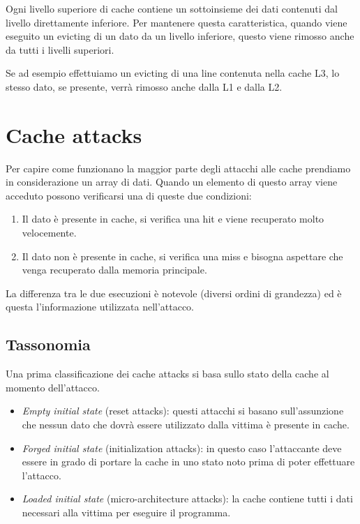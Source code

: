 				Ogni livello superiore di cache contiene un sottoinsieme dei dati contenuti dal livello direttamente inferiore. Per mantenere questa caratteristica, quando viene eseguito un evicting di un dato da un livello inferiore, questo viene rimosso anche da tutti i livelli superiori.
				
				Se ad esempio effettuiamo un evicting di una line contenuta nella cache L3, lo stesso dato, se presente, verrà rimosso anche dalla L1 e dalla L2.
				
	\section{Cache attacks}
		Per capire come funzionano la maggior parte degli attacchi alle cache prendiamo in considerazione un array di dati. Quando un elemento di questo array viene acceduto possono verificarsi una di queste due condizioni:
		
		\begin{enumerate}
			\item Il dato è presente in cache, si verifica una hit e viene recuperato molto velocemente.
			\item Il dato non è presente in cache, si verifica una miss e bisogna aspettare che venga recuperato dalla memoria principale.
		\end{enumerate}
		
		La differenza tra le due esecuzioni è notevole (diversi ordini di grandezza) ed è questa l'informazione utilizzata nell'attacco.
		
		\subsection{Tassonomia}
			Una prima classificazione dei cache attacks si basa sullo stato della cache al momento dell'attacco\cite{canteaut2006understanding}.
			
			\begin{itemize}
				\item \emph{Empty initial state} (reset attacks): questi attacchi si basano sull'assunzione che nessun dato che dovrà essere utilizzato dalla vittima è presente in cache.
				\item \emph{Forged initial state} (initialization attacks): in questo caso l'attaccante deve essere in grado di portare la cache in uno stato noto prima di poter effettuare l'attacco.
				\item \emph{Loaded initial state} (micro-architecture attacks): la cache contiene tutti i dati necessari alla vittima per eseguire il programma.
			\end{itemize}
		
